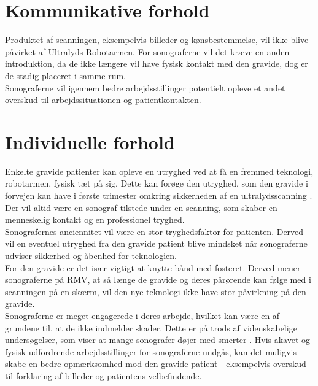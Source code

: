 \section{Kommunikative forhold}
Produktet af scanningen, eksempelvis billeder og kønsbestemmelse, vil ikke blive påvirket af Ultralyds Robotarmen.
For sonograferne vil det kræve en anden introduktion, da de ikke længere vil have fysisk kontakt med den gravide, dog er de stadig placeret i samme rum.  \\
Sonograferne vil igennem bedre arbejdsstillinger potentielt opleve et andet overskud til arbejdssituationen og patientkontakten.  

\section{Individuelle forhold}
Enkelte gravide patienter kan opleve en utryghed ved at få en fremmed teknologi, robotarmen, fysisk tæt på sig. Dette kan forøge den utryghed, som den gravide i forvejen kan have i første trimester omkring sikkerheden af en ultralydsscanning \cite{Lea1985}. Der vil altid være en sonograf tilstede under en scanning, som skaber en menneskelig kontakt og en professionel tryghed.  \\
Sonografernes anciennitet vil være en stor tryghedsfaktor for patienten. Derved vil en eventuel utryghed fra den gravide patient blive mindsket når sonograferne udviser sikkerhed og åbenhed for teknologien.\\
For den gravide er det især vigtigt at knytte bånd med fosteret. Derved mener sonograferne på RMV, at så længe de gravide og deres pårørende kan følge med i scanningen på en skærm, vil den nye teknologi ikke have stor påvirkning på den gravide. \\  
Sonograferne er meget engagerede i deres arbejde, hvilket kan være en af grundene til, at de ikke indmelder skader. Dette er på trods af videnskabelige undersøgelser, som viser at mange sonografer døjer med smerter \cite{BeckyMorton2007}. 
Hvis akavet og fysisk udfordrende arbejdsstillinger for sonograferne undgås, kan det muligvis skabe en bedre opmærksomhed mod den gravide patient - eksempelvis overskud til forklaring af billeder og patientens velbefindende.  

